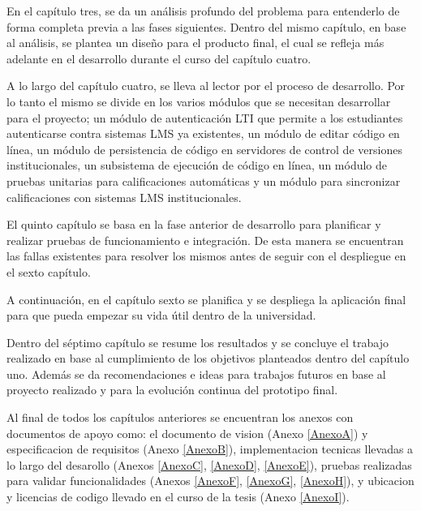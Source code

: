 En el capítulo tres, se da un análisis profundo del problema para entenderlo de forma completa previa a las fases siguientes. Dentro del mismo capítulo, en base al análisis, se plantea un diseño para el producto final, el cual se refleja más adelante en el desarrollo durante el curso del capítulo cuatro.
 
A lo largo del capítulo cuatro, se lleva al lector por el proceso de desarrollo. Por lo tanto el mismo se divide en los varios módulos que se necesitan desarrollar para el proyecto; un módulo de autenticación LTI  que permite a los estudiantes autenticarse contra sistemas LMS  ya existentes, un módulo de editar código en línea, un módulo de persistencia de código en servidores de control de versiones institucionales, un subsistema de ejecución de código en línea, un módulo de pruebas unitarias para calificaciones automáticas y un módulo para sincronizar calificaciones con sistemas LMS  institucionales.
 
El quinto capítulo se basa en la fase anterior de desarrollo para planificar y realizar pruebas de funcionamiento e integración. De esta manera se encuentran las fallas existentes para resolver los mismos antes de seguir con el despliegue en el sexto capítulo.
 
A continuación, en el capítulo sexto se planifica y se despliega la aplicación final para que pueda empezar su vida útil dentro de la universidad.
 
Dentro del séptimo capítulo se resume los resultados y se concluye el trabajo realizado en base al cumplimiento de los objetivos planteados dentro del capítulo uno. Además se da recomendaciones e ideas para trabajos futuros en base al proyecto realizado y para la evolución continua del prototipo final.

Al final de todos los capítulos anteriores se encuentran los anexos con documentos de apoyo como: el documento de vision (Anexo \ref{AnexoA}) y especificacion de requisitos (Anexo \ref{AnexoB}), implementacion tecnicas llevadas a lo largo del desarollo (Anexos \ref{AnexoC}, \ref{AnexoD}, \ref{AnexoE}), pruebas realizadas para validar funcionalidades (Anexos \ref{AnexoF}, \ref{AnexoG}, \ref{AnexoH}), y ubicacion y licencias de codigo llevado en el curso de la tesis (Anexo \ref{AnexoI}).
